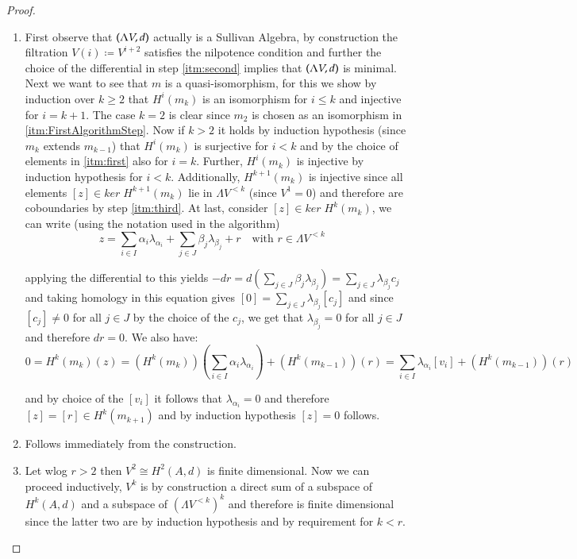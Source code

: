 \begin{proof}
\begin{enumerate}
 \item 

 First observe that $(\Lambda V,d)$ actually is a Sullivan Algebra, by construction the filtration $V(i) \coloneqq V^{i+2}$ satisfies
 the nilpotence condition and further the choice of the differential in step \ref{itm:second} implies that $(\Lambda V,d)$ is minimal.
 Next we want to see that $m$ is a quasi-isomorphism, for this we show by induction over $k \geq 2$ that
 $H^i(m_k)$ is an isomorphism for $i \leq k$ and injective for $ i = k +1$. The case $k = 2$ is clear since $m_2$ is chosen
 as an isomorphism in \ref{itm:FirstAlgorithmStep}. Now if $k > 2$ it holds by induction hypothesis (since $m_k$ extends
 $m_{k-1}$) that $H^i(m_k)$ is surjective for $i < k$ and by the choice of elements in \ref{itm:first} also for $i = k$.
 Further, $H^i(m_k)$ is injective by induction hypothesis for $i < k$. Additionally, $H^{k+1}(m_k)$ is injective since
 all elements $[z] \in ker \; H^{k+1}(m_k)$ lie in $\Lambda V^{<k}$ (since $V^1 = 0$) and therefore are
 coboundaries by step \ref{itm:third}. At last, consider $[z] \in ker \; H^k (m_k)$, we can write (using the notation used in
 the algorithm)
 $$z = \sum_{i \in I} \alpha_i \lambda_{\alpha_i} + \sum_{j \in J} \beta_j \lambda_{\beta_j} 
 + r \quad \text{with $r \in \Lambda V^{<k}$ }$$
 
 applying the differential to this yields
 $ -dr = d(\sum_{j \in J} \beta_j \lambda_{\beta_j}) = \sum_{j \in J} \lambda_{\beta_j} c_j$
 and taking homology in this equation gives $ [0] = \sum_{j \in J} \lambda_{\beta_j} [c_j]$ and since
 $[c_j] \neq 0$ for all $j \in J$ by the choice of the $c_j$, we get that $\lambda_{\beta_j} = 0$ for all $j \in J$ and 
 therefore $dr = 0$. We also have:
 $$0 = H^{k}(m_k)(z) = (H^k(m_k))( \sum_{i \in I} \alpha_i \lambda_{\alpha_i} ) + (H^k(m_{k-1}))(r)
    = \sum_{i \in I} \lambda_{\alpha_i} [v_i] + (H^k(m_{k-1}))(r) $$
    
and by choice of the $[v_i]$ it follows that $\lambda_{\alpha_i} = 0$ and therefore 
$ [z] = [r] \in H^k ( m_{k+1})$ and by induction hypothesis $[z] = 0$ follows.

 \item Follows immediately from the construction.
 \item Let wlog $r > 2$ then $V^2 \cong H^2(A,d)$ is finite dimensional. Now we can proceed inductively, 
 $V^k$ is by construction a
 direct sum of a subspace of $H^k(A,d)$ and a subspace of $(\Lambda V^{ <k })^k$ and therefore is finite dimensional since
 the latter two are by induction hypothesis and by requirement for $k<r$.
 \end{enumerate}
\end{proof}

